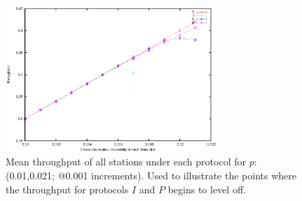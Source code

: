 \documentclass[twocolumn]{article}
\begin{document}
\begin{figure}
    \centering
    \includegraphics[width=8cm]{plots/tpbi_throughput.eps}
    \caption{\footnotesize Mean throughput of all stations under each protocol for $p$:(0.01,0.021; @0.001 increments). Used to illustrate the points where the throughput for protocols $I$ and $P$ begins to level off.}
    \label{fig:throughput_diverging}
\end{figure}
\end{document}
